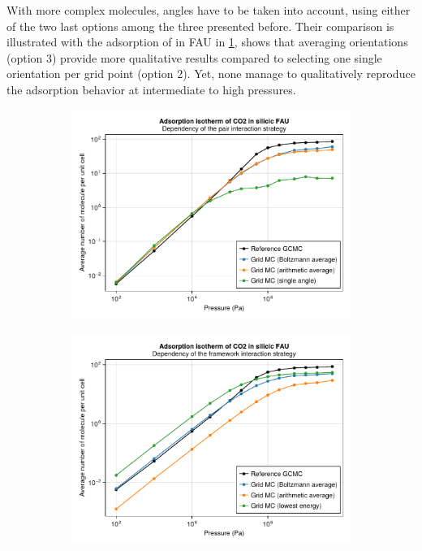 \documentclass[main.tex]{subfiles}
\begin{document}
With more complex molecules, angles have to be taken into account, using either of the two last options among the three presented before. Their comparison is illustrated with the adsorption of  in FAU in \cref{fig:gridMC-pair}, shows that averaging orientations (option 3) provide more qualitative results compared to selecting one single orientation per grid point (option 2). Yet, none manage to qualitatively reproduce the adsorption behavior at intermediate to high pressures.

\begin{figure}
	\centering
	\begin{subfigure}{0.93\columnwidth}
		\centering
		\includegraphics[width=0.86\columnwidth]{figures/gcmc/gridmc_CO2_FAU_comparison_pair.pdf}
		\label{fig:gridMC-pair}
	\end{subfigure}
	
	\vfill
	\begin{subfigure}{0.93\columnwidth}
		\centering
		\includegraphics[width=0.86\columnwidth]{figures/gcmc/gridmc_CO2_FAU_comparison_framework.pdf}
		\label{fig:gridMC-framework}
	\end{subfigure}
	

\end{figure}
\end{document}
